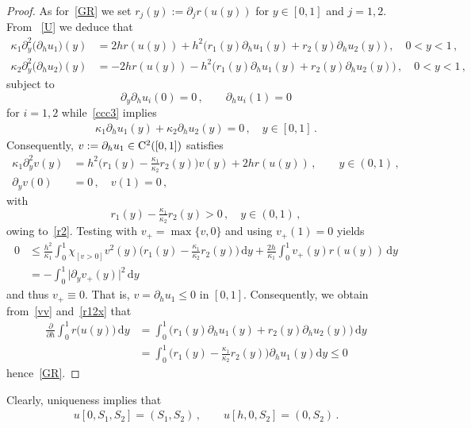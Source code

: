 \documentclass[reqno,11pt]{amsart}
\numberwithin{equation}{section}
\newcommand{\rd}{\mathrm{d}}
\begin{document}
\begin{proof}
As for~\eqref{GR} we set $r_j(y):=\partial_j r(u(y))$ for $y\in [0,1]$ and $j=1,2$. From ~\eqref{U} we deduce that
\begin{align*}
\kappa_1 \partial_y^2\big(\partial_h u_1\big)(y)&= 2hr(u(y))+h^2\big(r_1(y) \partial_h u_1(y)+r_2(y) \partial_h u_2(y)\big)\,, \quad 0<y<1\,, \\
\kappa_2 \partial_y^2\big(\partial_h u_2\big)(y)&= -2h r(u(y))-h^2\big(r_1(y) \partial_h u_1(y)+r_2(y) \partial_h u_2(y)\big)\,, \quad 0<y<1\,, 
\end{align*}
subject to
$$
\partial_y\partial_h u_i(0)=0\,,\qquad \partial_h u_i(1)=0
$$ 
for $i=1,2$ while~\eqref{ccc3} implies
\begin{align}\label{vv}
\kappa_1\partial_h u_1(y)+\kappa_2\partial_h u_2(y)
=0 \, , \quad y \in [0,1]\,. 
\end{align}
Consequently, $v:=\partial_h u_1\in {\rm C}^2([0,1])$ satisfies
\begin{align*}
\kappa_1 \partial_y^2v(y)&=h^2\Big(r_1(y)-\tfrac{\kappa_1}{\kappa_2}r_2(y)\Big) v(y)
+2h r(u(y))\,,\qquad y\in(0,1)\,,\\
\partial_{y}v(0)&=0\,,\quad v(1)=0\,,
\end{align*}
with 
\begin{equation}\label{r12x}
r_1(y)-\tfrac{\kappa_1}{\kappa_2}r_2(y)>0\,,\quad y\in (0,1)\,,
\end{equation} 
owing to~\eqref{r2}. Testing with $v_+=\max\{v,0\}$  and using
 $v_+(1)=0$ yields
\begin{align*}
0&\le \frac{h^2}{\kappa_1}\int_0^1\chi_{[v>0]}v^2(y) \Big(r_1(y)-\tfrac{\kappa_1}{\kappa_2}r_2(y)\Big)\,\rd y+\frac{2h}{\kappa_1}\int_0^1 v_+(y) r(u(y))\,\rd y\\
&=-\int_0^1\vert \partial_y v_+(y)\vert^2\,\rd y
\end{align*} 
and thus $v_+\equiv 0$. That is, $v=\partial_h u_1\le 0$ in $[0,1]$. Consequently, we obtain from~\eqref{vv} and~\eqref{r12x} that
\begin{align*}
\frac{\partial}{\partial h}\int_0^1 r\big(u(y)\big)\,\rd y& =\int_0^1\big(r_1(y) \partial_h u_1(y)+r_2(y) \partial_h u_2(y)\big)\,\rd y\\
&=\int_0^1\Big(r_1(y)-\tfrac{\kappa_1}{\kappa_2}r_2(y)\Big)\partial_h u_1(y) \rd y\le 0
\end{align*} 
hence~\eqref{GR}.
\end{proof}

Clearly, uniqueness implies that 
\begin{align}\label{I2}
u[0,S_1,S_2]= (S_1,S_2)\,,\qquad u[h,0,S_2]=(0,S_2)
\,.
\end{align}
\end{document}
